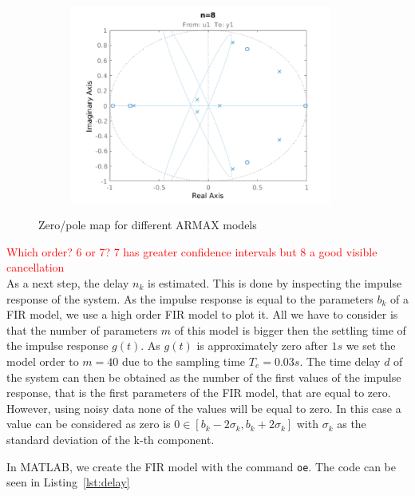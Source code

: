 \documentclass{scrartcl}
\newcommand*{\matlabcode}[3]{\begin{figure}[h!]\end{figure}}
\begin{document}
\begin{figure}[h]
\begin{subfigure}{.49\textwidth}
		\label{fig:zp7}
	\end{subfigure}\hfill
	\begin{subfigure}{.49\textwidth}
		\includegraphics[height=6.5cm]{figures/zp8.pdf}
		\label{fig:zp8}
	\end{subfigure}
	\caption{Zero/pole map for different ARMAX models}
	\label{fig:zero_pole}
\end{figure}


\textcolor{red}{Which order? 6 or 7? 7 has greater confidence intervals but 8 a good visible cancellation} \\

As a next step, the delay $n_k$ is estimated. This is done by inspecting the impulse response of the system. As the impulse response is equal to the parameters $b_k$ of a FIR model, we use a high order FIR model to plot it. All we have to consider is that the number of parameters $m$ of this model is bigger then the settling time of the impulse response $g(t)$. As $g(t)$ is approximately zero after $ 1 s$ we set the model order to $m = 40$ due to the sampling time $T_e = 0.03 s$.
The time delay $d$ of the system can then be obtained as the number of the first values of the impulse response, that is the first parameters of the FIR model, that are equal to zero. 
However, using noisy data none of the values will be equal to zero. In this case a value can be considered as zero is $ 0 \in \left[b_k -2 \sigma_k, b_k + 2\sigma_k \right] $ with $\sigma_k$ as the standard deviation of the k-th component. 

In MATLAB, we create the FIR model with the command \texttt{oe}. The code can be seen in Listing~\ref{lst:delay}

\matlabcode{../matlab/ce2/estimate_delay.m}{Matlab function for the estimation of the delay using a FIR model.}{lst:delay}
\end{document}
